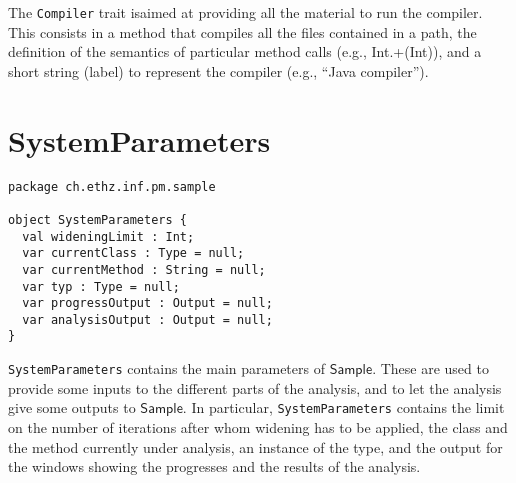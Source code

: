 \documentclass[11pt]{article}
\newcommand{\ScalaAnalyzer}{\ensuremath{\mathsf{Sample}}}
\newcommand{\statement}[1]{\lstinline{#1}}
\begin{document}
The \statement{Compiler} trait  isaimed at providing all the material to run the compiler. This consists in a method that compiles all the files contained in a path, the definition of the semantics of particular method calls (e.g., Int.+(Int)), and a short string (label) to represent the compiler (e.g., \textquotedblleft Java compiler\textquotedblright).


\section{SystemParameters}
\begin{lstlisting}
package ch.ethz.inf.pm.sample

object SystemParameters {
  val wideningLimit : Int;
  var currentClass : Type = null;
  var currentMethod : String = null;
  var typ : Type = null;
  var progressOutput : Output = null;
  var analysisOutput : Output = null;
}
\end{lstlisting}

\statement{SystemParameters} contains the main parameters of \ScalaAnalyzer. These are used to provide some inputs to the different parts of the analysis, and to let the analysis give some outputs to \ScalaAnalyzer. In particular, \statement{SystemParameters} contains the limit on the number of iterations after whom widening has to be applied, the class and the method currently under analysis, an instance of the type, and the output for the windows showing the progresses and the results of the analysis.
\end{document}
